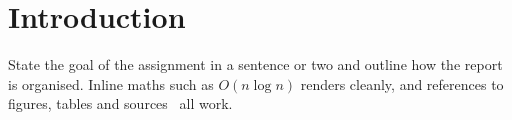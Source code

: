 \section{Introduction}
State the goal of the assignment in a sentence or two and outline how the
report is organised. Inline maths such as $O(n\log n)$ renders cleanly, and
references to figures, tables and sources~\cite{ref:clrs} all work.
